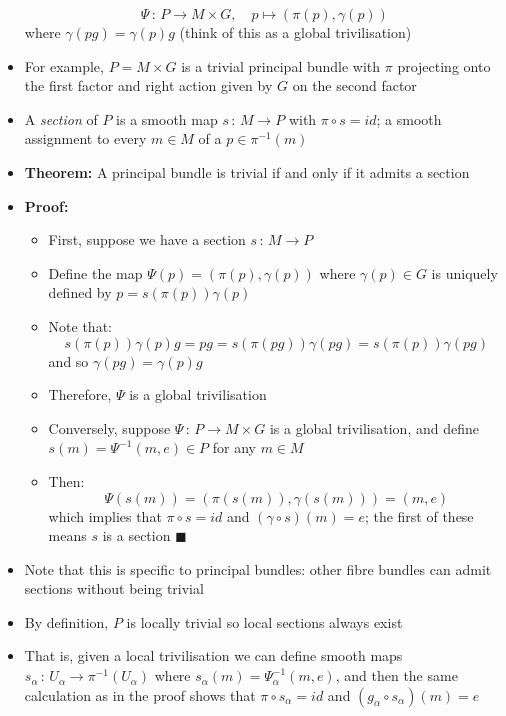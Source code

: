 \documentclass[12pt,a4paper]{article}
\numberwithin{equation}{section}
\begin{document}
\begin{itemize}
		\begin{equation}
			\Psi\,:\,P\to M\times G,\quad p\mapsto(\pi(p),\gamma(p))
		\end{equation}
		where $\gamma(pg)=\gamma(p)g$ (think of this as a global trivilisation)
		\item For example, $P=M\times G$ is a trivial principal bundle with $\pi$ projecting onto the first factor and right action given by $G$ on the second factor
		\item A \textit{section} of $P$ is a smooth map $s\,:\,M\to P$ with $\pi\circ s=id$; a smooth assignment to every $m\in M$ of a $p\in\pi^{-1}(m)$
		\item \textbf{Theorem:} A principal bundle is trivial if and only if it admits a section
		\item \textbf{Proof:}
		\begin{itemize}
			\item First, suppose we have a section $s\,:\,M\to P$
			\item Define the map $\Psi(p)=(\pi(p),\gamma(p))$ where $\gamma(p)\in G$ is uniquely defined by $p=s(\pi(p))\gamma(p)$
			\item Note that:
			\begin{equation}
				s(\pi(p))\gamma(p)g=pg=s(\pi(pg))\gamma(pg)=s(\pi(p))\gamma(pg)
			\end{equation}
			and so $\gamma(pg)=\gamma(p)g$
			\item Therefore, $\Psi$ is a global trivilisation
			\item Conversely, suppose $\Psi\,:\,P\to M\times G$ is a global trivilisation, and define $s(m)=\Psi^{-1}(m,e)\in P$ for any $m\in M$
			\item Then:
			\begin{equation}
				\Psi(s(m))=(\pi(s(m)),\gamma(s(m)))=(m,e)
			\end{equation}
			which implies that $\pi\circ s=id$ and $(\gamma\circ s)(m)=e$; the first of these means $s$ is a section $\blacksquare$
		\end{itemize}
		\item Note that this is specific to principal bundles: other fibre bundles can admit sections without being trivial
		\item By definition, $P$ is locally trivial so local sections always exist
		\item That is, given a local trivilisation we can define smooth maps $s_{\alpha}\,:\,U_{\alpha}\to \pi^{-1}(U_{\alpha})$ where $s_{\alpha}(m)=\Psi_{\alpha}^{-1}(m,e)$, and then the same calculation as in the proof shows that $\pi\circ s_{\alpha}=id$ and $(g_{\alpha}\circ s_{\alpha})(m)=e$

\end{itemize}
\end{document}

